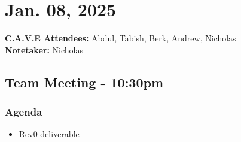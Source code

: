 	\pagebreak
	\section*{Jan. 08, 2025}

	\textbf{C.A.V.E Attendees:} Abdul, Tabish, Berk, Andrew, Nicholas\\
	\textbf{Notetaker:} Nicholas

	\subsection*{Team Meeting - 10:30pm}
		\subsubsection*{Agenda}
			\begin{itemize}
				\item Rev0 deliverable
			\end{itemize}

